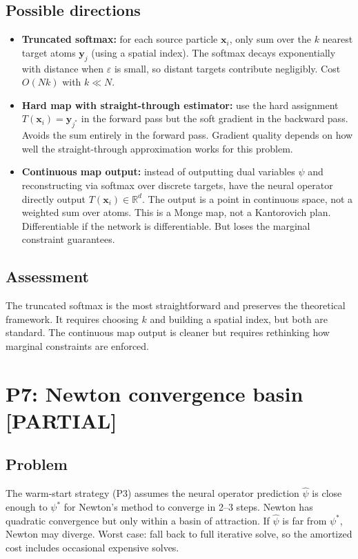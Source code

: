 \documentclass[11pt]{article}
\newcommand{\RR}{\mathbb{R}}
\newcommand{\bx}{\mathbf{x}}
\newcommand{\by}{\mathbf{y}}
\newcommand{\statuspartial}{\textcolor{partial}{\textbf{[PARTIAL]}}}
\begin{document}
\subsection*{Possible directions}
\begin{itemize}[nosep,leftmargin=1.5em]
    \item \textbf{Truncated softmax:} for each source particle $\bx_i$, only sum over the $k$ nearest target atoms $\by_j$ (using a spatial index). The softmax decays exponentially with distance when $\varepsilon$ is small, so distant targets contribute negligibly. Cost $O(Nk)$ with $k \ll N$.
    \item \textbf{Hard map with straight-through estimator:} use the hard assignment $T(\bx_i) = \by_{j^*}$ in the forward pass but the soft gradient in the backward pass. Avoids the sum entirely in the forward pass. Gradient quality depends on how well the straight-through approximation works for this problem.
    \item \textbf{Continuous map output:} instead of outputting dual variables $\psi$ and reconstructing via softmax over discrete targets, have the neural operator directly output $T(\bx_i) \in \RR^d$. The output is a point in continuous space, not a weighted sum over atoms. This is a Monge map, not a Kantorovich plan. Differentiable if the network is differentiable. But loses the marginal constraint guarantees.
\end{itemize}

\subsection*{Assessment}
The truncated softmax is the most straightforward and preserves the theoretical framework. It requires choosing $k$ and building a spatial index, but both are standard. The continuous map output is cleaner but requires rethinking how marginal constraints are enforced.

\section{P7: Newton convergence basin \statuspartial}

\subsection*{Problem}
The warm-start strategy (P3) assumes the neural operator prediction $\hat\psi$ is close enough to $\psi^*$ for Newton's method to converge in 2--3 steps. Newton has quadratic convergence but only within a basin of attraction. If $\hat\psi$ is far from $\psi^*$, Newton may diverge. Worst case: fall back to full iterative solve, so the amortized cost includes occasional expensive solves.
\end{document}
